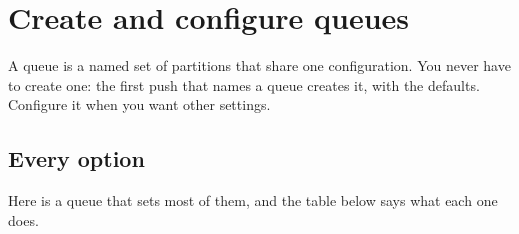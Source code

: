 
\section{Create and configure queues}

A queue is a named set of partitions that share one configuration. You never have to create one:
the first push that names a queue creates it, with the defaults. Configure it when you want other
settings.




\subsection{Every option}

Here is a queue that sets most of them, and the table below says what each one does.


